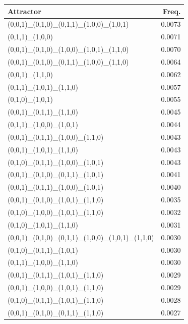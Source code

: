 \begin{minipage}[t]{\linewidth}
\begin{tabular}{@{}lr@{}}
\toprule
Attractor & Freq.\\
\midrule
(0,0,1)\_(0,1,0)\_(0,1,1)\_(1,0,0)\_(1,0,1)      & 0.0073 \\
(0,1,1)\_(1,0,0)                                   & 0.0071 \\
(0,0,1)\_(0,1,0)\_(1,0,0)\_(1,0,1)\_(1,1,0)      & 0.0070 \\
(0,0,1)\_(0,1,0)\_(0,1,1)\_(1,0,0)\_(1,1,0)      & 0.0064 \\
(0,0,1)\_(1,1,0)                                   & 0.0062 \\
(0,1,1)\_(1,0,1)\_(1,1,0)                         & 0.0057 \\
(0,1,0)\_(1,0,1)                                   & 0.0055 \\
(0,0,1)\_(0,1,1)\_(1,1,0)                         & 0.0045 \\
(0,1,1)\_(1,0,0)\_(1,0,1)                         & 0.0044 \\
(0,0,1)\_(0,1,1)\_(1,0,0)\_(1,1,0)                & 0.0043 \\
(0,0,1)\_(1,0,1)\_(1,1,0)                         & 0.0043 \\
(0,1,0)\_(0,1,1)\_(1,0,0)\_(1,0,1)                & 0.0043 \\
(0,0,1)\_(0,1,0)\_(0,1,1)\_(1,0,1)                & 0.0041 \\
(0,0,1)\_(0,1,1)\_(1,0,0)\_(1,0,1)                & 0.0040 \\
(0,0,1)\_(0,1,0)\_(1,0,1)\_(1,1,0)                & 0.0035 \\
(0,1,0)\_(1,0,0)\_(1,0,1)\_(1,1,0)                & 0.0032 \\
(0,1,0)\_(1,0,1)\_(1,1,0)                         & 0.0031 \\
(0,0,1)\_(0,1,0)\_(0,1,1)\_(1,0,0)\_(1,0,1)\_(1,1,0) & 0.0030 \\
(0,1,0)\_(0,1,1)\_(1,0,1)                         & 0.0030 \\
(0,1,1)\_(1,0,0)\_(1,1,0)                         & 0.0030 \\
(0,0,1)\_(0,1,1)\_(1,0,1)\_(1,1,0)                & 0.0029 \\
(0,0,1)\_(1,0,0)\_(1,0,1)\_(1,1,0)                & 0.0029 \\
(0,1,0)\_(0,1,1)\_(1,0,1)\_(1,1,0)                & 0.0028 \\
(0,0,1)\_(0,1,0)\_(0,1,1)\_(1,1,0)                & 0.0027 \\

\end{tabular}
\end{minipage}
